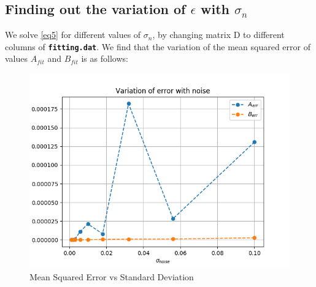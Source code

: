 \documentclass[11pt, a4paper]{article}
\begin{document}
        \subsection{Finding out the variation of $\epsilon$ with $\sigma_n$}
            We solve \eqref{eq5} for different values of $\sigma_n$, by changing matrix D to different columns of \texttt{\textbf{fitting.dat}}. We find that the variation of the mean squared error of values $A_{fit}$ and $B_{fit}$ is as follows:
            \begin{figure}[H]
                \centering
                \includegraphics[scale=0.5]{Fig 3.png}  %
                \caption{Mean Squared Error vs Standard Deviation}
                \label{fig:errorSTD}
            \end{figure}
\end{document}
